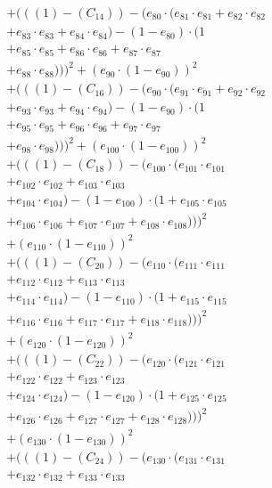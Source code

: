 \documentclass[10pt, a4paper]{article}
\begin{document}
\begin{small}
\begin{align*}
& + (((1) - (C_{14})) - (e_{80} \cdot (e_{81} \cdot e_{81} + e_{82} \cdot e_{82} \\
& + e_{83} \cdot e_{83} + e_{84} \cdot e_{84}) - (1 - e_{80}) \cdot (1 \\
& + e_{85} \cdot e_{85} + e_{86} \cdot e_{86} + e_{87} \cdot e_{87} \\
& + e_{88} \cdot e_{88})))^{2} + (e_{90} \cdot (1 - e_{90}))^{2} \\
& + (((1) - (C_{16})) - (e_{90} \cdot (e_{91} \cdot e_{91} + e_{92} \cdot e_{92} \\
& + e_{93} \cdot e_{93} + e_{94} \cdot e_{94}) - (1 - e_{90}) \cdot (1 \\
& + e_{95} \cdot e_{95} + e_{96} \cdot e_{96} + e_{97} \cdot e_{97} \\
& + e_{98} \cdot e_{98})))^{2} + (e_{100} \cdot (1 - e_{100}))^{2} \\
& + (((1) - (C_{18})) - (e_{100} \cdot (e_{101} \cdot e_{101} \\
& + e_{102} \cdot e_{102} + e_{103} \cdot e_{103} \\
& + e_{104} \cdot e_{104}) - (1 - e_{100}) \cdot (1 + e_{105} \cdot e_{105} \\
& + e_{106} \cdot e_{106} + e_{107} \cdot e_{107} + e_{108} \cdot e_{108})))^{2} \\
& + (e_{110} \cdot (1 - e_{110}))^{2} \\
& + (((1) - (C_{20})) - (e_{110} \cdot (e_{111} \cdot e_{111} \\
& + e_{112} \cdot e_{112} + e_{113} \cdot e_{113} \\
& + e_{114} \cdot e_{114}) - (1 - e_{110}) \cdot (1 + e_{115} \cdot e_{115} \\
& + e_{116} \cdot e_{116} + e_{117} \cdot e_{117} + e_{118} \cdot e_{118})))^{2} \\
& + (e_{120} \cdot (1 - e_{120}))^{2} \\
& + (((1) - (C_{22})) - (e_{120} \cdot (e_{121} \cdot e_{121} \\
& + e_{122} \cdot e_{122} + e_{123} \cdot e_{123} \\
& + e_{124} \cdot e_{124}) - (1 - e_{120}) \cdot (1 + e_{125} \cdot e_{125} \\
& + e_{126} \cdot e_{126} + e_{127} \cdot e_{127} + e_{128} \cdot e_{128})))^{2} \\
& + (e_{130} \cdot (1 - e_{130}))^{2} \\
& + (((1) - (C_{24})) - (e_{130} \cdot (e_{131} \cdot e_{131} \\
& + e_{132} \cdot e_{132} + e_{133} \cdot e_{133} \\

\end{align*}
\end{small}
\end{document}
